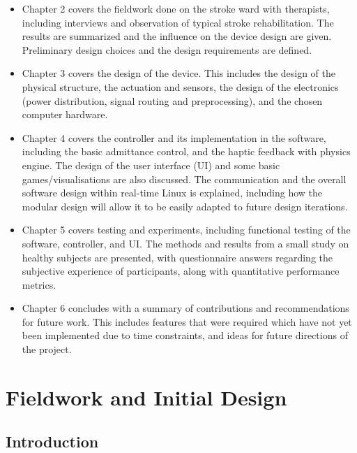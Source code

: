 \documentclass[12pt]{report}
\begin{document}
\begin{itemize}

\item Chapter 2 covers the fieldwork done on the stroke ward with therapists, including interviews and observation of typical stroke rehabilitation. The results are summarized and the influence on the device design are given. Preliminary design choices and the design requirements are defined.

\item Chapter 3 covers the design of the device. This includes the design of the physical structure, the actuation and sensors, the design of the electronics (power distribution, signal routing and preprocessing), and the chosen computer hardware. 

\item Chapter 4 covers the controller and its implementation in the software, including the basic admittance control, and the haptic feedback with physics engine. The design of the user interface (UI) and some basic games/visualisations are also discussed. The communication and the overall software design within real-time Linux is explained, including how the modular design will allow it to be easily adapted to future design iterations. 

\item Chapter 5 covers testing and experiments, including functional testing of the software, controller, and UI. The methods and results from a small study on healthy subjects are presented, with questionnaire answers regarding the subjective experience of participants, along with quantitative performance metrics. 

\item Chapter 6 concludes with a summary of contributions and recommendations for future work. This includes features that were required which have not yet been implemented due to time constraints, and ideas for future directions of the project. 


\end{itemize}



\afterpage{\null\newpage}
\chapter{Fieldwork and Initial Design} 

\section{Introduction}
\end{document}
